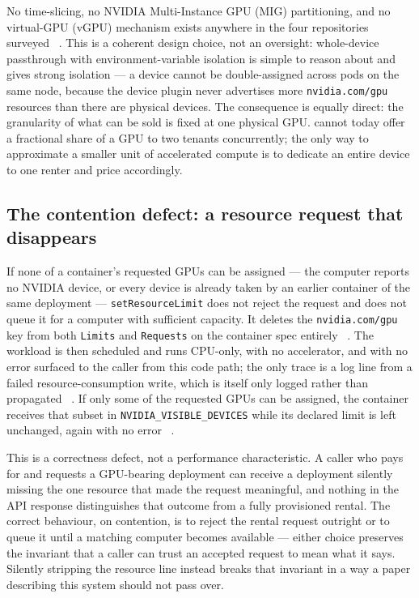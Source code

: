 No time-slicing, no NVIDIA Multi-Instance GPU (MIG) partitioning, and no virtual-GPU (vGPU)
mechanism exists anywhere in the four repositories surveyed \shipped\ .
This is a coherent design choice, not an oversight: whole-device passthrough with
environment-variable isolation is simple to reason about and gives strong isolation — a device
cannot be double-assigned across pods on the same node, because the device plugin never advertises
more \texttt{nvidia.com/gpu} resources than there are physical devices. The consequence is equally
direct: the granularity of what can be sold is fixed at one physical GPU. \FluxEdge cannot today
offer a fractional share of a GPU to two tenants concurrently; the only way to approximate a smaller
unit of accelerated compute is to dedicate an entire device to one renter and price accordingly.

\subsection{The contention defect: a resource request that disappears}
\label{sec:accelerated-compute-contention}

If none of a container's requested GPUs can be assigned --- the computer reports no NVIDIA
device, or every device is already taken by an earlier container of the same deployment ---
\texttt{set\allowbreak{}Resource\allowbreak{}Limit} does not reject the request and does not queue it for a computer with
sufficient capacity. It deletes the \texttt{nvidia.com/gpu} key from both \texttt{Limits} and
\texttt{Requests} on the container spec entirely \shipped\ .
The workload is then scheduled and runs CPU-only, with no accelerator, and with no error surfaced to
the caller from this code path; the only trace is a log line from a failed resource-consumption
write, which is itself only logged rather than propagated \shipped\ .
If only some of the requested GPUs can be assigned, the container receives that subset in
\texttt{NVIDIA\_VISIBLE\_DEVICES} while its declared limit is left unchanged, again with no error
\shipped\ .

This is a correctness defect, not a performance characteristic. A caller who pays for and requests a
GPU-bearing deployment can receive a deployment silently missing the one resource that made the
request meaningful, and nothing in the API response distinguishes that outcome from a fully
provisioned rental. The correct behaviour, on contention, is to reject the rental request outright
or to queue it until a matching computer becomes available — either choice preserves the invariant
that a caller can trust an accepted request to mean what it says. Silently stripping the resource
line instead breaks that invariant in a way a paper describing this system should not pass over.

